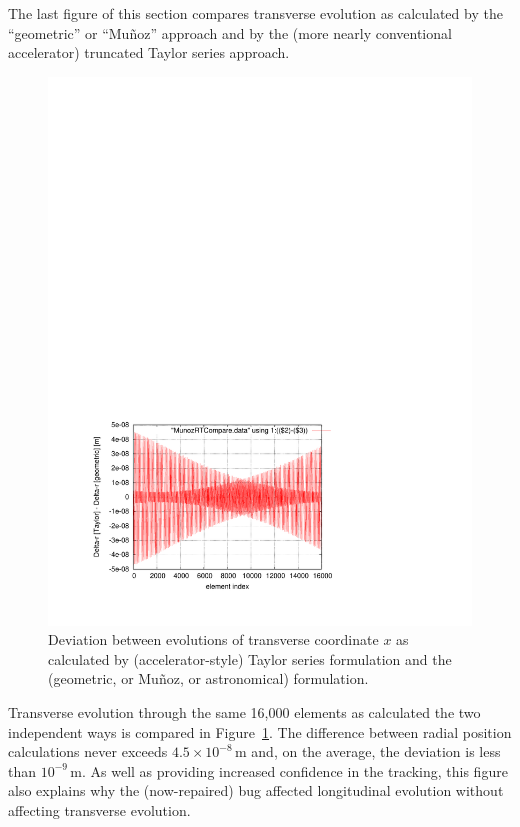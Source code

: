 \documentclass[]{article}
\begin{document}
The last figure of this section compares transverse evolution
as calculated by the ``geometric'' or ``Mu\~noz'' approach and
by the (more nearly conventional accelerator) truncated Taylor series
approach. 
%
\begin{figure}[h]
\centering
\includegraphics[scale=0.8]{pdf/MunozRT-compare.pdf}
\caption{\label{fig:MunozRT-compare}Deviation between evolutions of
transverse coordinate $x$ as calculated by (accelerator-style) 
Taylor series formulation and the (geometric, or Mu\~noz, or 
astronomical) formulation.}
\end{figure}
%
Transverse evolution through the same 16,000 elements as
calculated the two independent ways is compared in 
Figure~\ref{fig:MunozRT-compare}. The difference between
radial position calculations never exceeds 
$4.5\times10^{-8}\,$m and, on the average, the deviation
is less than $10^{-9}\,$m. As well as providing
increased confidence in the tracking, this figure also explains
why the (now-repaired) bug affected longitudinal evolution
without affecting transverse evolution.
\end{document}
